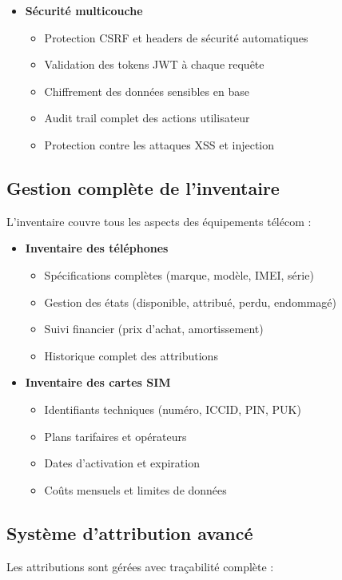 \documentclass[12pt,a4paper]{report}
\begin{document}
\begin{itemize}
\item \textbf{Sécurité multicouche}
  \begin{itemize}
  \item Protection CSRF et headers de sécurité automatiques
  \item Validation des tokens JWT à chaque requête
  \item Chiffrement des données sensibles en base
  \item Audit trail complet des actions utilisateur
  \item Protection contre les attaques XSS et injection
  \end{itemize}
\end{itemize}

\subsection{Gestion complète de l'inventaire}
L'inventaire couvre tous les aspects des équipements télécom :

\begin{itemize}
\item \textbf{Inventaire des téléphones}
  \begin{itemize}
  \item Spécifications complètes (marque, modèle, IMEI, série)
  \item Gestion des états (disponible, attribué, perdu, endommagé)
  \item Suivi financier (prix d'achat, amortissement)
  \item Historique complet des attributions
  \end{itemize}

\item \textbf{Inventaire des cartes SIM}
  \begin{itemize}
  \item Identifiants techniques (numéro, ICCID, PIN, PUK)
  \item Plans tarifaires et opérateurs
  \item Dates d'activation et expiration
  \item Coûts mensuels et limites de données
  \end{itemize}
\end{itemize}

\subsection{Système d'attribution avancé}
Les attributions sont gérées avec traçabilité complète :
\end{document}
